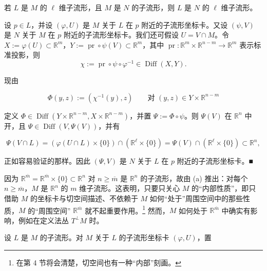 \begin{remark}

\begin{items}
\item

若 $ L $ 是 $ M $ 的 $ \ell $ 维子流形，且 $ M $ 是 $ N $ 的子流形，则 $ L $ 是 $ N $ 的 $ \ell $ 维子流形。

\proofhead
设 $ p\in L $，并设 $ (\varphi,U) $ 是 $ M $ 关于 $ L $ 在 $ p $ 附近的子流形坐标卡。又设 $ (\psi,V) $ 是 $ N $ 关于 $ M $ 在 $ p $ 附近的子流形坐标卡。我们还可假设 $ U=V\cap M $。令 $ X:=\varphi(U)\subset\mathbb{R}^m $，$ Y:=\operatorname{pr}\circ\psi(V)\subset\mathbb{R}^m $，其中 $ \operatorname{pr}:\mathbb{R}^m\times\mathbb{R}^{n-m}\to\mathbb{R}^m $ 表示标准投影，则
\[
\chi:=\operatorname{pr}\circ\psi\circ\varphi^{-1}\in\operatorname{Diff}(X,Y).
\]

现由

\[
\Phi(y,z):=(\chi^{-1}(y),z)\qquad \text{对 } (y,z)\in Y\times\mathbb{R}^{n-m}
\]

定义 $ \Phi\in\operatorname{Diff}(Y\times\mathbb{R}^{n-m},X\times\mathbb{R}^{n-m}) $，并置 $ \Psi:=\Phi\circ\psi $。则 $ \Psi(V) $ 在 $ \mathbb{R}^n $ 中开，且 $ \Psi\in\operatorname{Diff}(V,\Psi(V)) $，并有

\[
\Psi(V\cap L)=(\varphi(U\cap L)\times\{0\})\cap(\mathbb{R}^\ell\times\{0\})=\Psi(V)\cap(\mathbb{R}^\ell\times\{0\})\subset\mathbb{R}^n,
\]

正如容易验证的那样。因此 $ (\Psi,V) $ 是 $ N $ 关于 $ L $ 在 $ p $ 附近的子流形坐标卡。\nobreak\hspace{0.35em}■

\item

因为 $ \mathbb{R}^{\overline{m}}=\mathbb{R}^{\overline{m}}\times\{0\}\subset\mathbb{R}^n $ 对 $ n\ge\overline{m} $ 是 $ \mathbb{R}^n $ 的子流形，故由 (a) 推出：对每个 $ n\ge\overline{m} $，$ M $ 是 $ \mathbb{R}^n $ 的 $ m $ 维子流形。这表明，只要只关心 $ M $ 的“内部性质”，即只借助 $ M $ 的坐标卡与切空间描述、不依赖于 $ M $ 如何“处于”周围空间中的那些性质，$ M $ 的“周围空间” $ \mathbb{R}^{\overline{m}} $ 就不起重要作用。\footnote{在第 4 节将会清楚，切空间也有一种“内部”刻画。} 然而，$ M $ 如何处于 $ \mathbb{R}^{\overline{m}} $ 中确实有影响，例如在定义法丛 $ T^\perp M $ 时。

\item

设 $ L $ 是 $ M $ 的子流形。对 $ M $ 关于 $ L $ 的子流形坐标卡 $ (\varphi,U) $，置


\end{items}
\end{remark}
